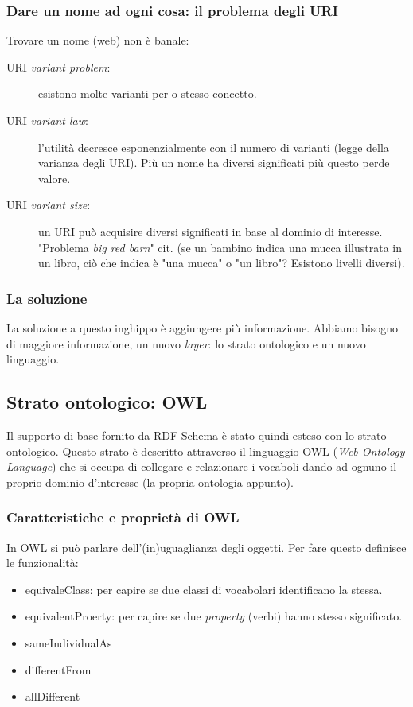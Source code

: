 			\subsubsection{Dare un nome ad ogni cosa: il problema degli URI}
				Trovare un nome (web) non è banale:
				\begin{description}
					\item[URI \emph{variant problem}:] esistono molte varianti per o stesso concetto.
					\item[URI \emph{variant law}:] l'utilità decresce esponenzialmente con il numero di varianti (legge della varianza degli URI). Più un nome ha diversi significati più questo perde valore.
					\item[URI \emph{variant size}:] un URI può acquisire diversi significati in base al dominio di interesse. "Problema \emph{big red barn}" cit. (se un bambino indica una mucca illustrata in un libro, ciò che indica è "una mucca" o "un libro"? Esistono livelli diversi).
				\end{description}				
			
			\subsubsection{La soluzione}
				La soluzione a questo inghippo è aggiungere più informazione. Abbiamo bisogno di maggiore informazione, un nuovo \emph{layer}: lo strato ontologico e un nuovo linguaggio.
		
		\subsection{Strato ontologico: OWL}
			Il supporto di base fornito da RDF Schema è stato quindi esteso con lo strato ontologico. Questo strato è descritto attraverso il linguaggio OWL (\emph{Web Ontology Language}) che si occupa di collegare e relazionare i vocaboli dando ad ognuno il proprio dominio d'interesse (la propria ontologia appunto).
		
			\subsubsection{Caratteristiche e proprietà di OWL}
				In OWL si può parlare dell'(in)uguaglianza degli oggetti. Per fare questo definisce le funzionalità:
					\begin{itemize}
						\item equivaleClass: per capire se due classi di vocabolari identificano la stessa.
						\item equivalentProerty: per capire se due \emph{property} (verbi) hanno stesso significato.
						\item sameIndividualAs
						\item differentFrom
						\item allDifferent
					\end{itemize}
					
